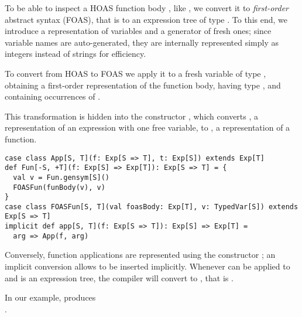 To be able to inspect a HOAS function body , like , we convert it to \emph{first-order} abstract syntax (FOAS), that is to an expression tree of type .
To this end, we introduce a representation of variables and a generator of fresh ones; since variable names are auto-generated, they are internally represented simply as integers instead of strings for efficiency.

To convert  from HOAS to FOAS we apply it to a fresh variable  of type , obtaining a first-order representation of the function body, having type , and containing occurrences of .

This transformation is hidden into the constructor , which converts , a representation of an expression with one free variable, to , a representation of a function.

\begin{lstlisting}
case class App[S, T](f: Exp[S => T], t: Exp[S]) extends Exp[T]
def Fun[-S, +T](f: Exp[S] => Exp[T]): Exp[S => T] = {
  val v = Fun.gensym[S]()
  FOASFun(funBody(v), v)
}
case class FOASFun[S, T](val foasBody: Exp[T], v: TypedVar[S]) extends Exp[S => T]
implicit def app[S, T](f: Exp[S => T]): Exp[S] => Exp[T] =
  arg => App(f, arg)
\end{lstlisting}

Conversely, function applications are represented using the constructor ; an implicit conversion allows  to be inserted implicitly. Whenever  can be applied to  and  is an expression tree, the compiler will convert  to , that is .


In our example,  produces\\
%
.

